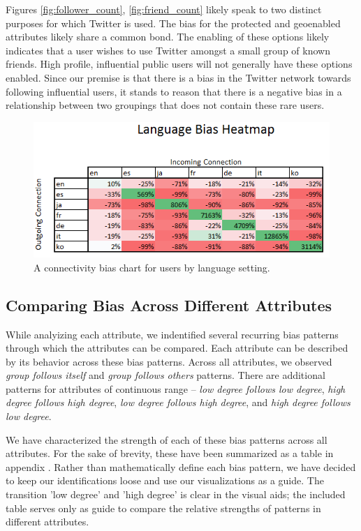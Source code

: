 Figures \ref{fig:follower_count}, \ref{fig:friend_count} likely speak to two distinct purposes for which Twitter is used.  The bias for the protected and geoenabled attributes likely share a common bond.  The enabling of these options likely indicates that a user wishes to use Twitter amongst a small group of known friends.  High profile, influential public users will not generally have these options enabled.  Since our premise is that there is a bias in the Twitter network towards following influential users, it stands to reason that there is a negative bias in a relationship between two groupings that does not contain these rare users.



\begin{figure}[t]
 \centering
 \includegraphics[bb=0 0 424 194, scale=.5]{./images/Bates-Final/lang.png}
 \caption{A connectivity bias chart for users by language setting.}
 \label{fig:lang}
\end{figure}

\subsection{Comparing Bias Across Different Attributes}
\label{sub:crossattribute}
While analyizing each attribute, we indentified several recurring bias patterns through which the attributes can be compared.  Each attribute can be described by its behavior across these bias patterns.  Across all attributes, we observed \textit{group follows itself} and \textit{group follows others} patterns.  There are additional patterns for attributes of continuous range -- \textit{low degree follows low degree}, \textit{high degree follows high degree}, \textit{low degree follows high degree}, and \textit{high degree follows low degree}.

We have characterized the strength of each of these bias patterns across all attributes.  For the sake of brevity, these have been summarized as a table in appendix \label{app:table_cross_attribute}.  Rather than mathematically define each bias pattern, we have decided to keep our identifications loose and use our visualizations as a guide.  The transition 'low degree' and 'high degree' is clear in the visual aids; the included table serves only as guide to compare the relative strengths of patterns in different attributes.